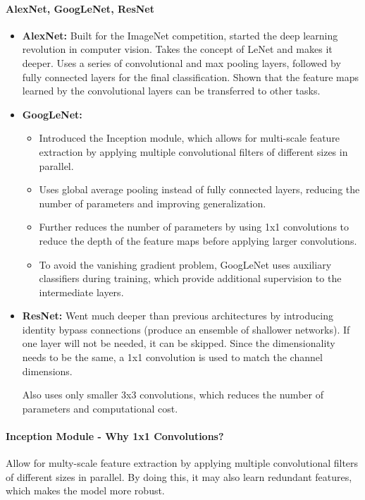 \paragraph{AlexNet, GoogLeNet, ResNet}
\begin{itemize}
    \item \textbf{AlexNet:} Built for the ImageNet competition, started the deep learning revolution in computer vision. 
    Takes the concept of LeNet and makes it deeper. Uses a series of convolutional and max pooling layers, 
    followed by fully connected layers for the final classification. 
    Shown that the feature maps learned by the convolutional layers can be transferred to other tasks.
    \item \textbf{GoogLeNet:}
    \begin{itemize}
        \item Introduced the Inception module, which allows for multi-scale feature extraction by applying multiple convolutional filters of different sizes in parallel.
        \item Uses global average pooling instead of fully connected layers, reducing the number of parameters and improving generalization.
        \item Further reduces the number of parameters by using 1x1 convolutions to reduce the depth of the feature maps before applying larger convolutions.
        \item To avoid the vanishing gradient problem, GoogLeNet uses auxiliary classifiers during training, which provide additional supervision to the intermediate layers.
    \end{itemize}
    \item \textbf{ResNet:} Went much deeper than previous architectures by introducing identity bypass connections (produce an ensemble of shallower networks).
    If one layer will not be needed, it can be skipped. Since the dimensionality needs to be the same, a 1x1 convolution is used to match the channel dimensions.

    Also uses only smaller 3x3 convolutions, which reduces the number of parameters and computational cost.
\end{itemize}

\paragraph{Inception Module - Why 1x1 Convolutions?}
Allow for multy-scale feature extraction by applying multiple convolutional filters of different sizes in parallel.
By doing this, it may also learn redundant features, which makes the model more robust. 

